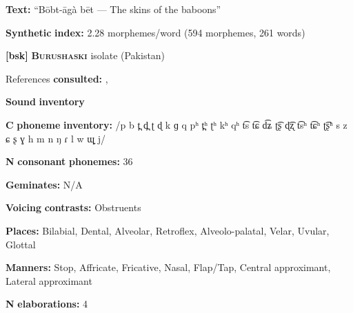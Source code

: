 \documentclass[output=paper]{langsci/langscibook}
\begin{document}
\begin{styleBody}
\textbf{Text:} “Bōbt-āgà bēt — The skins of the baboons” \citep[594-599]{Rapold2006}
\end{styleBody}

\begin{styleBody}
\textbf{Synthetic} \textbf{index:} 2.28 morphemes/word (594 morphemes, 261 words)
\end{styleBody}

\begin{styleBody}
\textbf{[bsk]}   \textbf{\textsc{Burushaski}}  isolate (Pakistan)
\end{styleBody}

\begin{styleBody}
References \textbf{consulted:} \citet{Anderson1997}, \citet{Yoshioka2012}
\end{styleBody}

\begin{styleBody}
\textbf{Sound} \textbf{inventory}
\end{styleBody}

\begin{styleBody}
\textbf{C} \textbf{phoneme} \textbf{inventory:} /p b t̪ d̪ ʈ ɖ k ɡ q pʰ t̪ʰ ʈʰ kʰ qʰ t͡s t͡ɕ d͡ʑ ʈ͡ʂ ɖ͡ʐ t͡sʰ t͡ɕʰ ʈ͡ʂʰ s z ɕ ʂ ɣ h m n ŋ ɾ l w ɰ̟ j/
\end{styleBody}

\begin{styleBody}
\textbf{N} \textbf{consonant} \textbf{phonemes:} 36
\end{styleBody}

\begin{styleBody}
\textbf{Geminates:} N/A
\end{styleBody}

\begin{styleBody}
\textbf{Voicing} \textbf{contrasts:} Obstruents
\end{styleBody}

\begin{styleBody}
\textbf{Places:} Bilabial, Dental, Alveolar, Retroflex, Alveolo-palatal, Velar, Uvular, Glottal
\end{styleBody}

\begin{styleBody}
\textbf{Manners:} Stop, Affricate, Fricative, Nasal, Flap/Tap, Central approximant, Lateral approximant
\end{styleBody}

\begin{styleBody}
\textbf{N} \textbf{elaborations:} 4
\end{styleBody}
\end{document}
